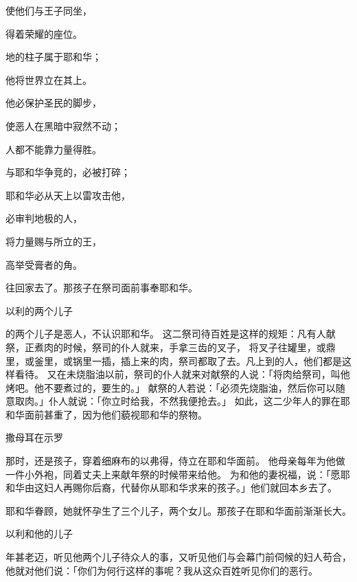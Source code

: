 {\par }{\Q 使他们与王子同坐，
\par }{\Q 得着荣耀的座位。
\par }{\Q 地的柱子属于耶和华；
\par }{\Q 他将世界立在其上。
\par }{\BB \par }{\Q {}他必保护圣民的脚步，
\par }{\Q 使恶人在黑暗中寂然不动；
\par }{\Q 人都不能靠力量得胜。
\par }{\Q {}与耶和华争竞的，必被打碎；
\par }{\Q 耶和华必从天上以雷攻击他，
\par }{\Q 必审判地极的人，
\par }{\Q 将力量赐与所立的王，
\par }{\Q 高举受膏者的角。
\par }{\PP {}往{}回家去了。那孩子在祭司{}面前事奉耶和华。
\par }{\SH 以利的两个儿子
\par }{\PP {}的两个儿子是恶人，不认识耶和华。
这二祭司待百姓是这样的规矩：凡有人献祭，正煮肉的时候，祭司的仆人就来，手拿三齿的叉子，
将叉子往罐里，或鼎里，或釜里，或锅里一插，插上来的肉，祭司都取了去。凡上到{}的{}人，他们都是这样看待。
又在未烧脂油以前，祭司的仆人就来对献祭的人说：「将肉给祭司，叫他烤吧。他不要煮过的，要生的。」
献祭的人若说：「必须先烧脂油，然后你可以随意取肉。」仆人就说：「你立时给我，不然我便抢去。」
如此，这二少年人的罪在耶和华面前甚重了，因为他们藐视耶和华的祭物。
\par }{\SH 撒母耳在示罗
\par }{\PP {}那时，{}还是孩子，穿着细麻布的以弗得，侍立在耶和华面前。
他母亲每年为他做一件小外袍，同着丈夫上来献年祭的时候带来给他。
为{}和他的妻祝福，说：「愿耶和华由这妇人再赐你后裔，代替你从耶和华求来的孩子。」他们就回本乡去了。
\par }{\PP {}耶和华眷顾{}，她就怀孕生了三个儿子，两个女儿。那孩子{}在耶和华面前渐渐长大。
\par }{\SH 以利和他的儿子
\par }{\PP {}年甚老迈，听见他两个儿子待{}众人的事，又听见他们与会幕门前伺候的妇人苟合，
他就对他们说：「你们为何行这样的事呢？我从这众百姓听见你们的恶行。
}
